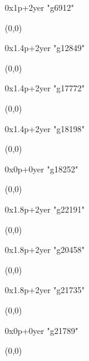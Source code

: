    0x1p+2yer "g6912"
  \begin{textblock}{1}(0,0)
  \end{textblock}

   0x1.4p+2yer "g12849"
  \begin{textblock}{1}(0,0)
  \end{textblock}

   0x1.4p+2yer "g17772"
  \begin{textblock}{1}(0,0)
  \end{textblock}

   0x1.4p+2yer "g18198"
  \begin{textblock}{1}(0,0)
  \end{textblock}

   0x0p+0yer "g18252"
  \begin{textblock}{1}(0,0)
  \end{textblock}

   0x1.8p+2yer "g22191"
  \begin{textblock}{1}(0,0)
  \end{textblock}

   0x1.8p+2yer "g20458"
  \begin{textblock}{1}(0,0)
  \end{textblock}

   0x1.8p+2yer "g21735"
  \begin{textblock}{1}(0,0)
  \end{textblock}

   0x0p+0yer "g21789"
  \begin{textblock}{1}(0,0)
  \end{textblock}
